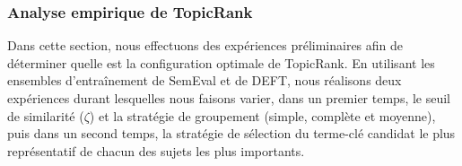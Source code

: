       \subsubsection{Analyse empirique de TopicRank}
      \label{subsubsec:main-automatic_keyphrase_annotation-unsupervised_automatic_keyphrase_extraction-evaluation-empirical_analysis_of_topicrank}
        Dans cette section, nous effectuons des expériences préliminaires afin
        de déterminer quelle est la configuration optimale de TopicRank. En
        utilisant les ensembles d'entraînement de SemEval et de DEFT, nous
        réalisons deux expériences durant lesquelles nous faisons varier, dans
        un premier temps, le seuil de similarité ($\zeta$) et la stratégie de
        groupement (simple, complète et moyenne), puis dans un second temps, la
        stratégie de sélection du terme-clé candidat le plus représentatif de
        chacun des sujets les plus importants.

